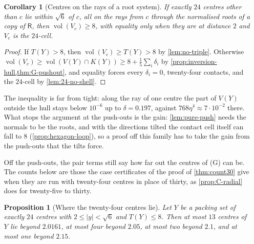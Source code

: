 \documentclass[11pt,reqno]{amsart}
\renewcommand{\_}{\origunderscore\allowbreak}
\numberwithin{equation}{section}
\theoremstyle{plain}
\newtheorem{prop}[thm]{Proposition}
\newtheorem{cor}[thm]{Corollary}
\theoremstyle{definition}
\theoremstyle{remark}
\newcommand{\Rt}{\mathsf{R}}                 %
\DeclareMathOperator{\vol}{vol}
\begin{document}
\begin{cor}[Centres on the rays of a root system]\label{cor:rays}
If exactly $24$ centres other than $c$ lie within $\sqrt6$ of $c$, all on
the rays from $c$ through the normalised roots of a copy of $\Rt$, then
$\vol(V_c)\ge8$, with equality only when they are at distance $2$ and $V_c$
is the $24$-cell.
\end{cor}

\begin{proof}
If $T(Y)>8$, then $\vol(V_c)\ge T(Y)>8$ by \cref{lem:no-triple}. Otherwise
$\vol(V_c)\ge\vol(V(Y)\cap K(Y))\ge8+\frac15\sum_i\delta_i$ by
\cref{prop:inversion-hull,thm:G-pushout}, and equality forces every
$\delta_i=0$, twenty-four contacts, and the $24$-cell by
\cref{lem:24-no-shell}.
\end{proof}

The inequality is far from tight: along the ray of one centre the part of
$V(Y)$ outside the hull stays below $10^{-6}$ up to $\delta=0.197$, against
$768\eta^4\approx7\cdot10^{-2}$ there. What stops the argument at the
push-outs is the gain: \cref{lem:pure-push} needs the normals to be the
roots, and with the directions tilted the contact cell itself can fall to
$8$ (\cref{prop:hexagon-loop}), so a proof off this family has to take the
gain from the push-outs that the tilts force.

Off the push-outs, the pair terms still say how far out the centres of (G)
can be. The counts below are those the case certificates of the proof of
\cref{thm:count30} give when they are run with twenty-four centres in place
of thirty, as \cref{prop:C-radial} does for twenty-five to thirty.

\begin{prop}[Where the twenty-four centres lie]\label{prop:G-radial}
Let $Y$ be a packing set of exactly $24$ centres with $2\le|y|<\sqrt6$ and
$T(Y)\le8$. Then at most $13$ centres of $Y$ lie beyond $2.0161$, at most
four beyond $2.05$, at most two beyond $2.1$, and at most one beyond $2.15$.
\end{prop}
\end{document}
